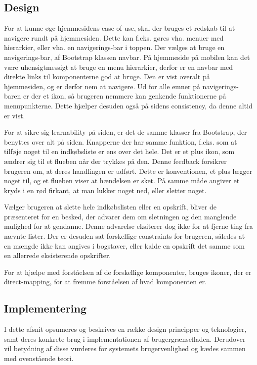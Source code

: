 \subsection{Design}
For at kunne øge hjemmesidens ease of use, skal der bruges et redskab til at navigere rundt på hjemmesiden.
Dette kan f.eks. gøres vha. menuer med hierarkier, eller vha. en navigerings-bar i toppen.
Der vælges at bruge en navigerings-bar, af Bootstrap klassen navbar. 
På hjemmeside på mobilen kan det være uhensigtmessigt at bruge en menu hierarkier, derfor er en navbar med direkte links til komponenterne god at bruge. 
Den er vist overalt på hjemmesiden, og er derfor nem at navigere.
Ud for alle emner på navigerings-baren er der et ikon, så brugeren nemmere kan genkende funktionerne på menupunkterne.
Dette hjælper desuden også på sidens consistency, da denne altid er vist.

For at sikre sig learnability på siden, er det de samme klasser fra Bootstrap, der benyttes over alt på siden. 
Knapperne der har samme funktion, f.eks. som at tilføje noget til en indkøbsliste er ens over det hele. 
Det er et plus ikon, som ændrer sig til et flueben når der trykkes på den.
Denne feedback forsikrer brugeren om, at deres handlingen er udført.
Dette er konventionen, et plus lægger noget til, og et flueben viser at hændelsen er sket.
På samme måde angiver et kryds i en rød firkant, at man lukker noget ned, eller sletter noget.

Vælger brugeren at slette hele indkøbslisten eller en opskrift, bliver de præsenteret for en besked, der advarer dem om sletningen og den manglende mulighed for at gendanne.
Denne advarelse eksiterer dog ikke for at fjerne ting fra nævnte lister.
Der er desuden sat forskellige constraints for brugeren, således at en mængde ikke kan angives i bogstaver, eller kalde en opskrift det samme som en allerrede eksisterende opskrifter.

For at hjælpe med forståelsen af de forskellige komponenter, bruges ikoner, der er direct-mapping, for at fremme forståelsen af hvad komponenten er.
	
\subsection{Implementering}
I dette afsnit opsumeres og beskrives en række design principper og teknologier, samt deres konkrete brug i implementationen af brugergrænsefladen. Derudover vil betydning af disse vurderes for systemets brugervenlighed og kædes sammen med ovenstående teori.

